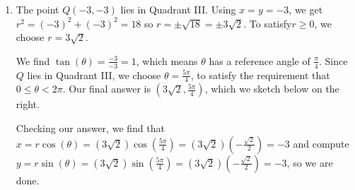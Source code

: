 \documentclass{ximera}
\begin{document}
\begin{example}
\begin{explanation}
\begin{enumerate}
\item  The point $Q(-3,-3)$ lies in Quadrant III.  Using $x = y = -3$, we get  $r^2 = (-3)^2 + (-3)^2 = 18$ so $r = \pm \sqrt{18} = \pm 3\sqrt{2}$.  To satisfy$r \geq 0$, we choose $r = 3 \sqrt{2}$.  

 

We find $\tan(\theta) = \frac{-3}{-3} = 1$, which means $\theta$ has a reference angle of $\frac{\pi}{4}$.  Since $Q$ lies in Quadrant III, we choose $\theta = \frac{5\pi}{4}$, to satisfy the requirement that $0 \leq \theta < 2\pi$.  Our final answer is  $\left(3\sqrt{2}, \frac{5\pi}{4}\right)$, which we sketch below on the right.  

 

Checking our answer, we find that $x = r\cos(\theta) = (3\sqrt{2}) \cos\left(\frac{5\pi}{4}\right) = (3\sqrt{2})\left(-\frac{\sqrt{2}}{2}\right) = -3$ and compute  $y = r\sin(\theta) = (3\sqrt{2}) \sin\left(\frac{5\pi}{4}\right) = (3\sqrt{2})\left(-\frac{\sqrt{2}}{2}\right) = -3$, so we are done.

\begin{image}
\end{image}
\end{enumerate}
\end{explanation}
\end{example}
\end{document}
